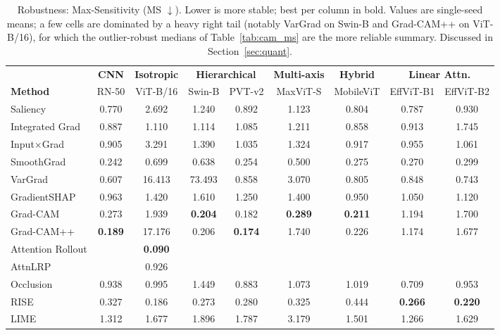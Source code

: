 \documentclass[final,5p,times,twocolumn]{elsarticle}
\newcommand{\best}[1]{\textbf{#1}}
\newcommand{\nd}{\textemdash}
\begin{document}
\begin{table}[t]
  \centering
  \caption{Robustness: Max-Sensitivity (MS $\downarrow$). Lower is more stable; best per column in bold. Values are single-seed means; a few cells are dominated by a heavy right tail (notably VarGrad on Swin-B and Grad-CAM++ on ViT-B/16), for which the outlier-robust medians of Table~\ref{tab:cam_ms} are the more reliable summary. Discussed in Section~\ref{sec:quant}.}
  \label{tab:ms}
  \setlength{\tabcolsep}{4pt}
  \begin{tabular}{l cc cc cc cc}
    \toprule
     & \multicolumn{1}{c}{\textbf{CNN}} & \multicolumn{1}{c}{\textbf{Isotropic}} & \multicolumn{2}{c}{\textbf{Hierarchical}} & \multicolumn{1}{c}{\textbf{Multi-axis}} & \multicolumn{1}{c}{\textbf{Hybrid}} & \multicolumn{2}{c}{\textbf{Linear Attn.}} \\
    \cmidrule(lr){2-2} \cmidrule(lr){3-3} \cmidrule(lr){4-5} \cmidrule(lr){6-6} \cmidrule(lr){7-7} \cmidrule(lr){8-9}
    \textbf{Method} & RN-50 & ViT-B/16 & Swin-B & PVT-v2 & MaxViT-S & MobileViT & EffViT-B1 & EffViT-B2 \\
    \midrule
    Saliency & 0.770 & 2.692 & 1.240 & 0.892 & 1.123 & 0.804 & 0.787 & 0.930 \\
    Integrated Grad & 0.887 & 1.110 & 1.114 & 1.085 & 1.211 & 0.858 & 0.913 & 1.745 \\
    Input$\times$Grad & 0.905 & 3.291 & 1.390 & 1.035 & 1.324 & 0.917 & 0.955 & 1.061 \\
    SmoothGrad & 0.242 & 0.699 & 0.638 & 0.254 & 0.500 & 0.275 & 0.270 & 0.299 \\
    VarGrad & 0.607 & 16.413 & 73.493 & 0.858 & 3.070 & 0.805 & 0.848 & 0.743 \\
    GradientSHAP & 0.963 & 1.420 & 1.610 & 1.250 & 1.400 & 0.950 & 1.050 & 1.120 \\
    \midrule
    Grad-CAM & 0.273 & 1.939 & \best{0.204} & 0.182 & \best{0.289} & \best{0.211} & 1.194 & 1.700 \\
    Grad-CAM++ & \best{0.189} & 17.176 & 0.206 & \best{0.174} & 1.740 & 0.226 & 1.174 & 1.677 \\
    \midrule
    Attention Rollout & \nd & \best{0.090} & \nd & \nd & \nd & \nd & \nd & \nd \\
    AttnLRP &\nd & 0.926 & \nd & \nd & \nd & \nd & \nd & \nd \\
    \midrule
    Occlusion & 0.938 & 0.995 & 1.449 & 0.883 & 1.073 & 1.019 & 0.709 & 0.953 \\
    RISE & 0.327 & 0.186 & 0.273 & 0.280 & 0.325 & 0.444 & \best{0.266} & \best{0.220} \\
    LIME & 1.312 & 1.677 & 1.896 & 1.787 & 3.179 & 1.501 & 1.266 & 1.629 \\
    \bottomrule
  \end{tabular}
\end{table}
\end{document}
